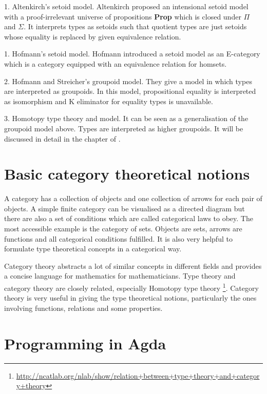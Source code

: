 1. Altenkirch's setoid model. Altenkirch \cite{alti:lics99} proposed an intensional setoid model
with a proof-irrelevant universe of propositions \textbf{Prop} which
is closed under $\Pi$ and $\Sigma$. It interprets types as setoids
such that quotient types are just setoids whose equality is replaced
by given equivalence relation.

1. Hofmann's setoid model. Hofmann \cite{hofmann1995interpretation}  introduced a setoid model as an
E-category which is a category equipped with an equivalence relation
for homsets.

2. Hofmann and Streicher's groupoid model. They give a model in which
types are interpreted as groupoids. In this model, propositional
equality is interpreted as isomorphism and K eliminator for equality
types is unavailable. 

3. Homotopy type theory and \wog model. It can be seen as a
generalisation of the groupoid model above. Types are interpreted as
higher groupoids. It will be discussed in detail in the chapter of \hott.




\section{Basic category theoretical notions}

A category has a collection of objects and one collection of arrows
for each pair of objects. 
A simple finite category can be visualised as a directed diagram
 but there are also a set of conditions which are called categorical laws to obey. 
The most accessible example is the category of sets. Objects are sets,
arrows are functions and all categorical conditions fulfilled. It is
also very helpful to formulate type theoretical concepts in a
categorical way. 

Category theory abstracts a lot of similar concepts in different
fields and provides a concise language for mathematics for
mathematicians.
Type theory and category theory are closely related,
especially Homotopy type theory
\footnote{\url{http://ncatlab.org/nlab/show/relation+between+type+theory+and+category+theory}}.
Category theory is very useful in giving the type theoretical
notions, particularly the ones involving functions, relations and some
properties.


\section{Programming in Agda}

